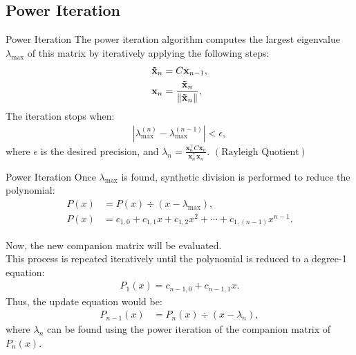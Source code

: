 \documentclass{beamer}
\providecommand{\brak}[1]{\ensuremath{\left(#1\right)}}
\theoremstyle{remark}
\numberwithin{equation}{section}
\begin{document}
\subsection{Power Iteration}

\begin{frame}{Power Iteration}
    The power iteration algorithm computes the largest eigenvalue $\lambda_{\text{max}}$ of this matrix by iteratively applying the following steps:
	\begin{align}
		\mathbf{\Tilde{x}}_{n} &= C \mathbf{x}_{n-1}, \\
		\mathbf{x}_{n} &= \frac{\mathbf{\Tilde{x}}_{n}}{\|\mathbf{\Tilde{x}}_{n}\|},
	\end{align}
    The iteration stops when:
	\begin{align}
		|\lambda_{\text{max}}^{(n)} - \lambda_{\text{max}}^{(n-1)}| < \epsilon,
	\end{align}
	where $\epsilon$ is the desired precision, and $\lambda_{n} = \frac{\mathbf{x}_{n}^\top C \mathbf{x}_{n}}{\mathbf{x}_{n}^\top \mathbf{x}_{n}}$.  \brak{\text{Rayleigh Quotient}}
    \end{frame}

\begin{frame}{Power Iteration}
	Once $\lambda_{\text{max}}$ is found, synthetic division is performed to reduce the polynomial:
	\begin{align}
		P(x) &= P(x) \div (x - \lambda_{\text{max}}), \\
		P(x) &= c_{1,0} + c_{1,1}x + c_{1,2}x^{2} + \cdots + c_{1,(n-1)}x^{n-1}.
	\end{align}

    Now, the new companion matrix will be evaluated. \\ This process is repeated iteratively until the polynomial is reduced to a degree-1 equation:
    \begin{align}
		P_1(x) = c_{n-1,0} + c_{n-1,1}x.
	\end{align}
	Thus, the update equation would be:
	\begin{align}
		P_{n-1}(x) &= P_{n}(x) \div (x - \lambda_{n}),
	\end{align}
    where $\lambda_{n}$ can be found using the power iteration of the companion matrix of $P_{n}(x)$.  
\end{frame}
\end{document}
